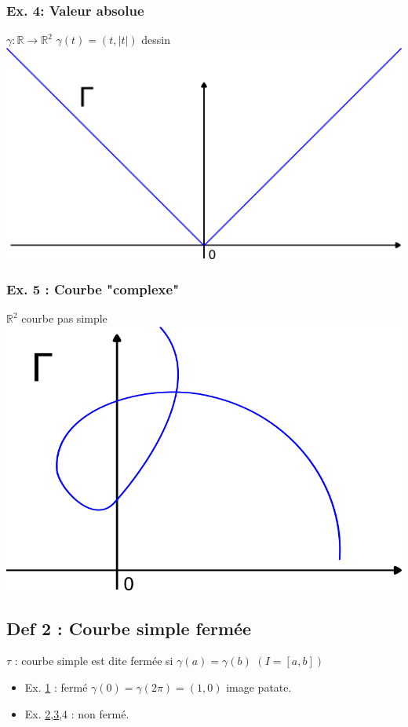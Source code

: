 \documentclass[11pt]{article}
\begin{document}
\subsubsection{Ex. 4: Valeur absolue}
\label{sec:orgheadline13}
\(\gamma : \mathbb{R} \rightarrow \mathbb{R}^2\) \(\gamma(t) = (t,|t|)\) dessin
\includegraphics[width=.9\linewidth]{images/an_ch2_ex_4.png}
\subsubsection{Ex. 5 : Courbe "complexe"}
\label{sec:orgheadline14}
\(\mathbb{R}^2\) courbe pas simple
\includegraphics[width=.9\linewidth]{images/an_ch2_ex_5.png}

\subsection{Def 2 :  Courbe simple fermée}
\label{sec:orgheadline16}
\(\tau\) : courbe simple est dite fermée si \(\gamma(a) = \gamma(b)\) \(\left(I = \left[a,b\right]\right)\)
\begin{itemize}
\item Ex. \hyperref[sec:orgheadline10]{1} : fermé \(\gamma(0)=\gamma(2\pi) = (1,0)\) image patate.
\item Ex. \hyperref[sec:orgheadline11]{2},\hyperref[sec:orgheadline12]{3},4 : non fermé.
\end{itemize}
\end{document}
